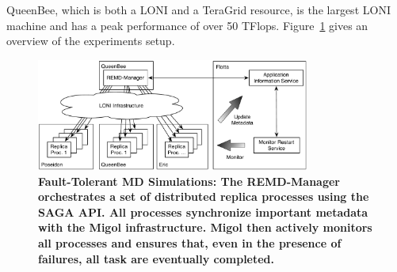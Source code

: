 \documentclass[times, 10pt, twocolumn]{article}
\newcommand{\up}{\vspace*{-1em}}
\begin{document}
QueenBee, which is both a LONI and a TeraGrid resource, is the largest LONI
machine and has a peak performance of over 50 TFlops.
Figure~\ref{fig:saga-taskfarming} gives an overview of the experiments
setup.

\begin{figure}[t]
    \centering
        \includegraphics[width=0.8\textwidth]{saga-taskfarming}
        \caption{\small \bf Fault-Tolerant MD Simulations: The
          REMD-Manager orchestrates a set of distributed replica
          processes using the SAGA API. All processes synchronize
          important metadata with the Migol infrastructure. Migol then
          actively monitors all processes and ensures that, even in
          the presence of failures, all task are eventually
          completed.\up\up}
    \label{fig:saga-taskfarming}
  \end{figure} 
\end{document}

